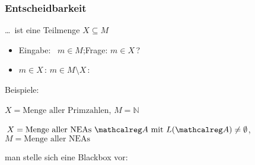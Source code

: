     \begin{frame}[t]
      \frametitle{Entscheidbarkeit}
      
      \begin{Itemize}
        \item
          \dots\ ist eine Teilmenge $X \subseteq M$
          \begin{itemize}
            \item
              Eingabe:~ $m \in M$;\quad Frage: $m \in X$\,?
            \item
              $m \in X$\,: \quad $m \in M \setminus X$\,: 
          \end{itemize}
          \par\smallskip
        \item<2->
          Beispiele:
          \begin{Itemize}
            \item
              $X = \text{Menge aller Primzahlen}$, $M = \mathbb{N}$
            \item
              $\,X = \text{Menge aller NEAs \Aut{A} mit $L(\Aut{A}) \neq \emptyset$}$, \\
              $M = \text{Menge aller NEAs}$
          \end{Itemize}
          \par\smallskip
        \item<3->
          man stelle sich eine Blackbox vor:
          \begin{center}
          \end{center}
      \end{Itemize}

      \par\smallskip


\end{frame}
